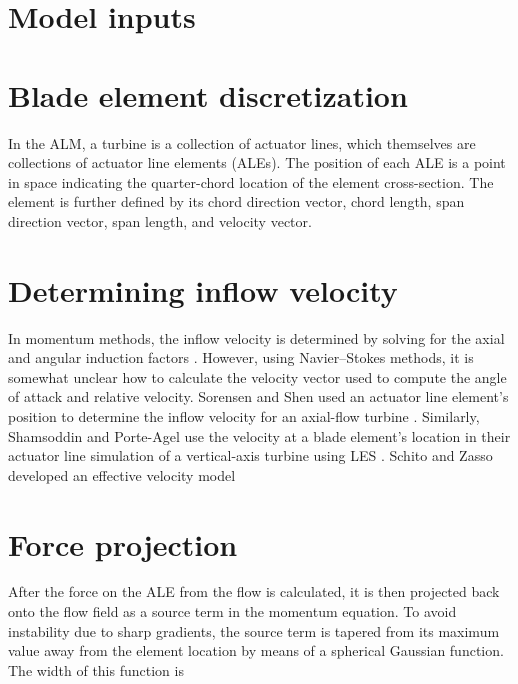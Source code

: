 
\section{Model inputs}


\section{Blade element discretization}

In the ALM, a turbine is a collection of actuator lines, which themselves are
collections of actuator line elements (ALEs). The position of each ALE is a
point in space indicating the quarter-chord location of the element
cross-section. The element is further defined by its chord direction vector,
chord length, span direction vector, span length, and velocity vector.

\section{Determining inflow velocity}

In momentum methods, the inflow velocity is determined by solving for the axial
and angular induction factors \cite{Manwell2002}. However, using Navier--Stokes
methods, it is somewhat unclear how to calculate the velocity vector used to
compute the angle of attack and relative velocity. Sorensen and Shen used an
actuator line element's position to determine the inflow velocity for an
axial-flow turbine \cite{Sorensen2002}. Similarly, Shamsoddin and Porte-Agel use
the velocity at a blade element's location in their actuator line simulation of
a vertical-axis turbine using LES \cite{Shamsoddin2014}. Schito and Zasso
developed an effective velocity model \cite{Schito2014}

\section{Force projection}

After the force on the ALE from the flow is calculated, it is then projected
back onto the flow field as a source term in the momentum equation. To avoid
instability due to sharp gradients, the source term is tapered from its maximum
value away from the element location by means of a spherical Gaussian function.
The width of this function is

